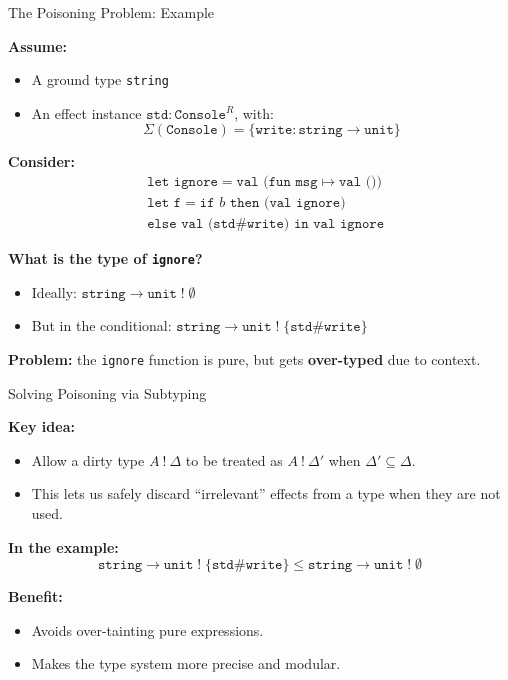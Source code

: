 \begin{frame}{The Poisoning Problem:  Example}

\textbf{Assume:}
\begin{itemize}
  \item A ground type \texttt{string}
  \item An effect instance \( \texttt{std} : \texttt{Console}^R \), with:
    \[
    \Sigma(\texttt{Console}) = \{ \texttt{write} : \texttt{string} \rightarrow \texttt{unit} \}
    \]
\end{itemize}

\vspace{1em}
\textbf{Consider:}
\begin{align*}
& \texttt{let ignore} = \texttt{val (fun msg} \mapsto \texttt{val ()}) \\
& \texttt{let f} = \texttt{if } b \texttt{ then (val ignore)} \\ 
& \texttt{else val (std\#write) in val ignore}
\end{align*}

\vspace{1em}
\textbf{What is the type of \texttt{ignore}?}
\begin{itemize}
  \item Ideally: \quad \( \texttt{string} \rightarrow \texttt{unit} \;!\; \emptyset \)
  \item But in the conditional: \( \texttt{string} \rightarrow \texttt{unit} \;!\; \{ \texttt{std}\#\texttt{write} \} \)
\end{itemize}
\textbf{Problem:} the \texttt{ignore} function is pure, but gets \textbf{over-typed} due to context.
\end{frame}

\begin{frame}{Solving Poisoning via Subtyping}

\textbf{Key idea:}
\begin{itemize}
  \item Allow a dirty type \( A\ !\ \Delta \) to be treated as \( A\ !\ \Delta' \) when \( \Delta' \subseteq \Delta \).
  \item This lets us safely discard “irrelevant” effects from a type when they are not used.
\end{itemize}

\vspace{1em}
\textbf{In the example:}
\[
\texttt{string} \rightarrow \texttt{unit} \;!\; \{ \texttt{std}\#\texttt{write} \}
\le
\texttt{string} \rightarrow \texttt{unit} \;!\; \emptyset
\]

\vspace{1em}
\textbf{Benefit:}
\begin{itemize}
  \item Avoids over-tainting pure expressions.
  \item Makes the type system more precise and modular.
\end{itemize}
\end{frame}


